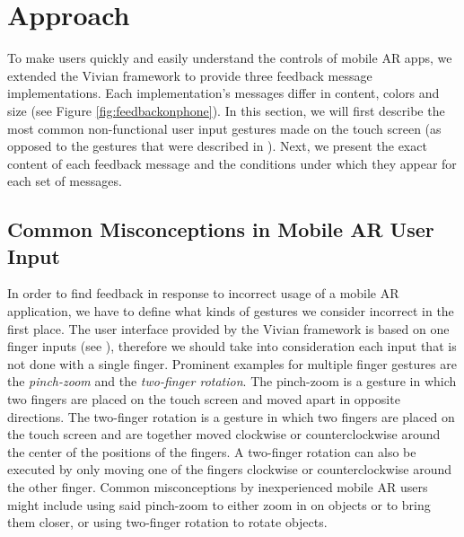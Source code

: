 \documentclass[11pt, a4paper]{article}
\begin{document}
	\section*{Approach}\label{sec:approach}
		To make users quickly and easily understand the controls of mobile \ac{AR} apps, we extended the Vivian framework to provide three feedback message implementations. Each implementation's messages differ in content, colors and size (see Figure \ref{fig:feedbackonphone}). In this section, we will first describe the most common non-functional user input gestures made on the touch screen (as opposed to the gestures that were described in ). Next, we present the exact content of each feedback message and the conditions under which they appear for each set of messages.

		\subsection*{Common Misconceptions in Mobile \ac{AR} User Input}\label{ssec:incorrectinput}
		In order to find feedback in response to incorrect usage of a mobile \ac{AR} application, we have to define what kinds of gestures we consider incorrect in the first place. The user interface provided by the Vivian framework is based on one finger inputs (see ), therefore we should take into consideration each input that is not done with a single finger. Prominent examples for multiple finger gestures are the \emph{pinch-zoom} and the \emph{two-finger rotation}. The pinch-zoom is a gesture in which two fingers are placed on the touch screen and moved apart in opposite directions. The two-finger rotation is a gesture in which two fingers are placed on the touch screen and are together moved clockwise or counterclockwise around the center of the positions of the fingers. A two-finger rotation can also be executed by only moving one of the fingers clockwise or counterclockwise around the other finger. Common misconceptions by inexperienced mobile \ac{AR} users might include using said pinch-zoom to either zoom in on objects or to bring them closer, or using two-finger rotation to rotate objects.
\end{document}
